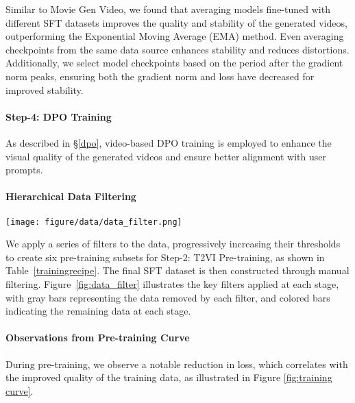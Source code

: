 Similar to Movie Gen Video, we found that averaging models fine-tuned with different SFT datasets improves the quality and stability of the generated videos, outperforming the Exponential Moving Average (EMA) method. Even averaging checkpoints from the same data source enhances stability and reduces distortions. Additionally, we select model checkpoints based on the period after the gradient norm peaks, ensuring both the gradient norm and loss have decreased for improved stability.

\paragraph{Step-4: DPO Training}
As described in \S\ref{dpo}, video-based DPO training is employed to enhance the visual quality of the generated videos and ensure better alignment with user prompts.



\paragraph{Hierarchical Data Filtering}
\begin{figure*}[t]
    \centering
    \texttt{[image: figure/data/data\_filter.png]}
    \caption{Hierarchical data filtering for pre-training and post-training.}
    \label{fig:data_filter}
\end{figure*}


We apply a series of filters to the data, progressively increasing their thresholds to create six pre-training subsets for Step-2: T2VI Pre-training, as shown in Table~\ref{trainingrecipe}. The final SFT dataset is then constructed through manual filtering. Figure~\ref{fig:data_filter} illustrates the key filters applied at each stage, with gray bars representing the data removed by each filter, and colored bars indicating the remaining data at each stage.



\paragraph{Observations from Pre-training Curve}
During pre-training, we observe a notable reduction in loss, which correlates with the improved quality of the training data, as illustrated in Figure \ref{fig:training curve}.

